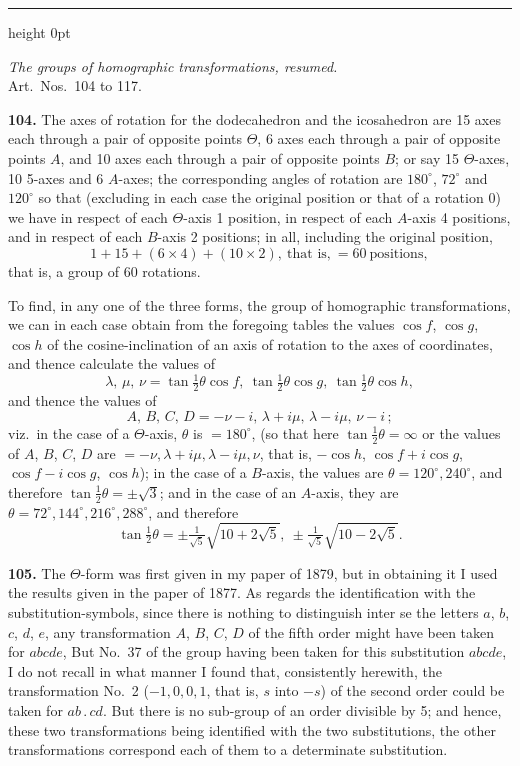 \documentclass[11pt,a4paper]{article}
\newcommand{\artno}[1]{\textbf{#1.}\quad}
\begin{document}
\bigskip
\hrule height 0pt
\bigskip

\begin{center}
\textit{The groups of homographic transformations, resumed.}\\
Art.\ Nos.\ 104 to 117.
\end{center}

\artno{104} The axes of rotation for the dodecahedron and the icosahedron
are 15 axes each through a pair of opposite points $\Theta$, 6 axes each
through a pair of opposite points $A$, and 10 axes each through a pair of
opposite points $B$; or say 15 $\Theta$-axes, 10 5-axes and 6 $A$-axes; the
corresponding angles of rotation are $180^{\circ}$, $72^{\circ}$ and
$120^{\circ}$ so that (excluding in each case the original position or that
of a rotation 0) we have in respect of each $\Theta$-axis 1 position, in
respect of each $A$-axis 4 positions, and in respect of each $B$-axis 2
positions; in all, including the original position,
\[
  1 + 15 + (6\times 4) + (10\times 2),\ \text{that is,}\ =60\ \text{positions},
\]
that is, a group of 60 rotations.

To find, in any one of the three forms, the group of homographic
transformations, we can in each case obtain from the foregoing tables the
values $\cos f$, $\cos g$, $\cos h$ of the cosine-inclination of an axis of
rotation to the axes of coordinates, and thence calculate the values of
\[
  \lambda,\,\mu,\,\nu = \tan\tfrac{1}{2}\theta\cos f,\ \tan\tfrac{1}{2}\theta\cos g,\
  \tan\tfrac{1}{2}\theta\cos h,
\]
and thence the values of
\[
  A,\,B,\,C,\,D = -\nu - i,\,\lambda + i\mu,\,\lambda - i\mu,\,\nu - i\,;
\]
viz.\ in the case of a $\Theta$-axis, $\theta$ is $=180^{\circ}$, (so that
here $\tan\tfrac{1}{2}\theta = \infty$ or the values of $A$, $B$, $C$, $D$
are $=-\nu, \lambda + i\mu, \lambda - i\mu, \nu$, that is,
$-\cos h$, $\cos f + i\cos g$, $\cos f - i\cos g$, $\cos h$); in the case of
a $B$-axis, the values are $\theta = 120^{\circ}, 240^{\circ}$, and therefore
$\tan\tfrac{1}{2}\theta = \pm\sqrt{3}$; and in the case of an $A$-axis, they
are $\theta = 72^{\circ}, 144^{\circ}, 216^{\circ}, 288^{\circ}$, and
therefore
\[
  \tan\tfrac{1}{2}\theta = \pm\tfrac{1}{\sqrt5}\sqrt{10 + 2\sqrt5},\
  \pm\tfrac{1}{\sqrt5}\sqrt{10 - 2\sqrt5}.
\]

\artno{105} The $\Theta$-form was first given in my paper of 1879, but in
obtaining it I used the results given in the paper of 1877. As regards the
identification with the substitution-symbols, since there is nothing to
distinguish inter se the letters $a$, $b$, $c$, $d$, $e$, any transformation
$A$, $B$, $C$, $D$ of the fifth order might have been taken for $abcde$,
But No.~37 of the group having been taken for this substitution $abcde$, I
do not recall in what manner I found that, consistently herewith, the
transformation No.~2 ($-1, 0, 0, 1$, that is, $s$ into $-s$) of the second
order could be taken for $ab\,.\,cd$. But there is no sub-group of an order
divisible by 5; and hence, these two transformations being identified with
the two substitutions, the other transformations correspond each of them to
a determinate substitution.
\end{document}

